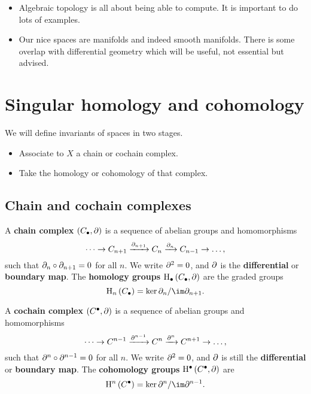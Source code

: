 \begin{remark*}
\hfill
\begin{itemize}
\item Algebraic topology is all about being able to compute. It is important to do lots of examples.
\item Our nice spaces are manifolds and indeed smooth manifolds. There is some overlap with differential geometry which will be useful, not essential but advised.
\end{itemize}
\end{remark*}

\pagebreak

\section{Singular homology and cohomology}


We will define invariants of spaces in two stages.
\begin{itemize}
\item Associate to $ X $ a chain or cochain complex.
\item Take the homology or cohomology of that complex.
\end{itemize}

\subsection{Chain and cochain complexes}

\begin{definition*}
A \textbf{chain complex} $ \br{C_\bullet, \da} $ is a sequence of abelian groups and homomorphisms
$$ \dots \to C_{n + 1} \xrightarrow{\partial_{n + 1}} C_n \xrightarrow{\partial_n} C_{n - 1} \to \dots, $$
such that $ \partial_n \circ \partial_{n + 1} = 0 $ for all $ n $. We write $ \partial^2 = 0 $, and $ \partial $ is the \textbf{differential} or \textbf{boundary map}. The \textbf{homology groups} $ \H_\bullet\br{C_\bullet, \da} $ are the graded groups
$$ \H_n\br{C_\bullet} = \ker \da_n / \im \da_{n + 1}. $$
\end{definition*}

\begin{definition*}
A \textbf{cochain complex} $ \br{C^\bullet, \da} $ is a sequence of abelian groups and homomorphisms
$$ \dots \to C^{n - 1} \xrightarrow{\partial^{n - 1}} C^n \xrightarrow{\partial^n} C^{n + 1} \to \dots, $$
such that $ \partial^n \circ \partial^{n - 1} = 0 $ for all $ n $. We write $ \partial^2 = 0 $, and $ \partial $ is still the \textbf{differential} or \textbf{boundary map}. The \textbf{cohomology groups} $ \H^\bullet\br{C^\bullet, \da} $ are
$$ \H^n\br{C^\bullet} = \ker \da^n / \im \da^{n - 1}. $$
\end{definition*}

